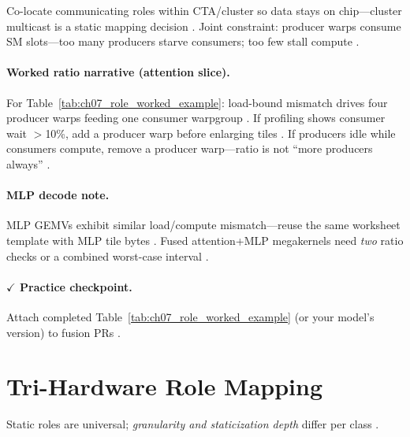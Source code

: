 Co-locate communicating roles within CTA/cluster so data stays on chip---cluster multicast is a static mapping decision \citep{nvidia2022hopper,shah2024flashattention3}.
Joint constraint: producer warps consume SM slots---too many producers starve consumers; too few stall compute \citep{patel2025llminference,yirage2026}.

\paragraph{Worked ratio narrative (attention slice).}
For Table~\ref{tab:ch07_role_worked_example}: load-bound mismatch drives four producer warps feeding one consumer warpgroup \citep{shah2024flashattention3,patel2025llminference}.
If profiling shows consumer wait $>$10\%, add a producer warp before enlarging tiles \citep{yirage2026,memoryfloor2026}.
If producers idle while consumers compute, remove a producer warp---ratio is not ``more producers always'' \citep{shah2024flashattention3,taxbreak2026}.

\paragraph{MLP decode note.}
MLP GEMVs exhibit similar load/compute mismatch---reuse the same worksheet template with MLP tile bytes \citep{taxbreak2026,kwon2023vllm,dao2022flashattention}.
Fused attention+MLP megakernels need \emph{two} ratio checks or a combined worst-case interval \citep{mpk2025,yirage2026,wu2024mirage}.

\paragraph{$\checkmark$ Practice checkpoint.}
Attach completed Table~\ref{tab:ch07_role_worked_example} (or your model's version) to fusion PRs \citep{yirage2026,taxbreak2026}.

\section{Tri-Hardware Role Mapping}
\label{sec:ch07_tri_hw_role_mapping}

Static roles are universal; \emph{granularity and staticization depth} differ per class \citep{patel2025llminference,chen2020compilerbasedhardw,yirage2026}.

